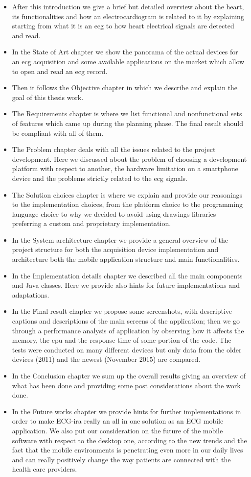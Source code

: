 \begin{itemize}
	\item After this introduction we give a brief but detailed overview about the heart, its functionalities and how an electrocardiogram is related to it by explaining starting from what it is an ecg to how heart electrical signals are detected and read.
	\item In the State of Art chapter we show the panorama of the actual devices for an ecg acquisition and some available applications on the market which allow to open and read an ecg record.
	\item Then it follows the Objective chapter in which we describe and explain the goal of this thesis work.
	\item The Requirements chapter is where we list functional and nonfunctional sets of features which came up during the planning phase. The final result should be compliant with all of them.
	\item The Problem chapter deals with all the issues related to the project development. Here we discussed about the problem of choosing a development platform with respect to another, the hardware limitation on a smartphone device and the problems strictly related to the ecg signals.
	\item The Solution choices chapter is where we explain and provide our reasonings to the implementation choices, from the platform choice to the programming language choice to why we decided to avoid using drawings libraries preferring a custom and proprietary implementation.
	\item In the System architecture chapter we provide a general overview of the project structure for both the acquisition device implementation and architecture both the mobile application structure and main functionalities.
	\item In the Implementation details chapter we described all the main components and Java classes. Here we provide also hints for future implementations and adaptations.
	\item In the Final result chapter we propose some screenshots, with descriptive captions and descriptions of the main screens of the application; then we go through a performance analysis of application by observing how it affects the memory, the cpu and the response time of some portion of the code. The tests were conducted on many different devices but only data from the older devices (2011) and the newest (November 2015) are compared.
	\item In the Conclusion chapter we sum up the overall results giving an overview of what has been done and providing some post considerations about the work done.
	\item In the Future works chapter we provide hints for further implementations in order to make ECG-ira really an all in one solution as an ECG mobile application. We also put our consideration on the future of the mobile software with respect to the desktop one, according to the new trends and the fact that the mobile environments is penetrating even more in our daily lives and can really positively change the way patients are connected with the health care providers.
\end{itemize}
